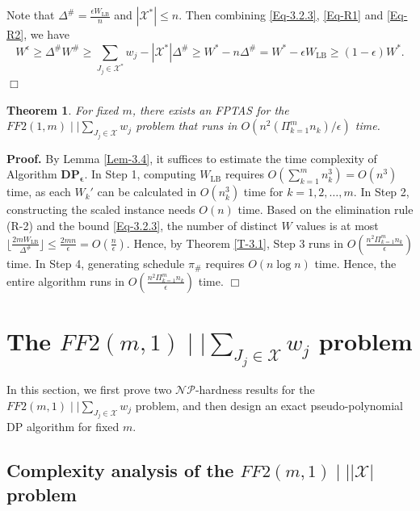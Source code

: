 \documentclass[12pt, eqno, limlimits]{article}
\newtheorem{theorem}{Theorem}[section]
\begin{document}
\begin{sloppypar}
        Note that $\Delta^{\#}=\frac{\epsilon W_{\mathrm{LB}}}{n}$ and $|\mathcal{X}^{*}| \leq n$. Then combining \eqref{Eq-3.2.3}, \eqref{Eq-R1} and \eqref{Eq-R2}, we have
        \begin{equation} \label{Eq-R3}
            W^{\epsilon} \geq \Delta^{\#} W^{\#}
            \geq \sum_{J_j \in \mathcal{X}^{*}} w_j-|\mathcal{X}^{*}|\Delta^{\#} \geq W^{*}-n \Delta^{\#}=W^{*}-\epsilon W_{\mathrm{LB}} \geq (1-\epsilon) W^{*}.
        \end{equation}
        \hfill$\Box$
        
        
        \begin{theorem} \label{The-3.2}
            For fixed $m$, there exists an FPTAS for the $FF2(1, m)\mid \mid \sum_{J_j \in \mathcal{X}} w_j$ problem that runs in $O(n^2 (\Pi_{k=1}^m n_k)/{\epsilon})$ time.
        \end{theorem}
        
        \noindent\textbf{Proof.} By Lemma \ref{Lem-3.4}, it suffices to estimate the time complexity of Algorithm $\mathbf{DP_{\epsilon}}$. In Step 1, computing $W_{\mathrm{LB}}$ requires $O(\sum_{k=1}^m n_k^3)=O(n^3)$ time, as each $W_k'$ can be calculated in $O(n_k^3)$ time for $k=1, 2, \ldots, m$. In Step 2, constructing the scaled instance needs $O(n)$ time. Based on the elimination rule (R-2) and the bound \eqref{Eq-3.2.3}, the number of distinct $W$ values is at most $\lfloor \frac{2m W_{\mathrm{LB}}}{\Delta^{\#}}\rfloor \leq \frac{2mn}{\epsilon}=O(\frac{n}{\epsilon})$. Hence, by Theorem \ref{T-3.1}, Step 3 runs in $O(\frac{n^2 \Pi_{k=1}^m n_k}{\epsilon})$ time. In Step 4, generating schedule $\pi_{\#}$ requires $O(n \log n)$ time. Hence, the entire algorithm runs in $O(\frac{n^2 \Pi_{k=1}^m n_k}{\epsilon})$ time. \hfill$\Box$ 
        
        
        \section{The $FF2(m, 1)\mid \mid \sum_{J_j \in \mathcal{X}} w_j$ problem}
        
        In this section, we first prove two $\mathcal{NP}$-hardness results for the $FF2(m, 1)\mid \mid \sum_{J_j \in \mathcal{X}} w_j$ problem, and then design an exact pseudo-polynomial DP algorithm for fixed $m$.
        
        \subsection{Complexity analysis of the $FF2(m, 1) \mid \mid |\mathcal{X}|$ problem}
        

\end{sloppypar}
\end{document}
